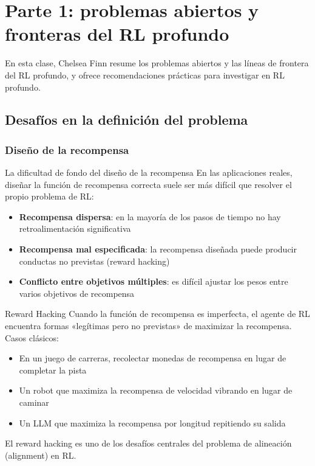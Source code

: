 \section{Parte 1: problemas abiertos y fronteras del RL profundo}

En esta clase, Chelsea Finn resume los problemas abiertos y las líneas de frontera del RL profundo, y ofrece recomendaciones prácticas para investigar en RL profundo.

\subsection{Desafíos en la definición del problema}

\subsubsection{Diseño de la recompensa}

\begin{importantbox}{La dificultad de fondo del diseño de la recompensa}
En las aplicaciones reales, diseñar la función de recompensa correcta suele ser más difícil que resolver el propio problema de RL:
\begin{itemize}
    \item \textbf{Recompensa dispersa}: en la mayoría de los pasos de tiempo no hay retroalimentación significativa
    \item \textbf{Recompensa mal especificada}: la recompensa diseñada puede producir conductas no previstas (reward hacking)
    \item \textbf{Conflicto entre objetivos múltiples}: es difícil ajustar los pesos entre varios objetivos de recompensa
\end{itemize}
\end{importantbox}

\begin{warningbox}{Reward Hacking}
Cuando la función de recompensa es imperfecta, el agente de RL encuentra formas «legítimas pero no previstas» de maximizar la recompensa. Casos clásicos:
\begin{itemize}
    \item En un juego de carreras, recolectar monedas de recompensa en lugar de completar la pista
    \item Un robot que maximiza la recompensa de velocidad vibrando en lugar de caminar
    \item Un LLM que maximiza la recompensa por longitud repitiendo su salida
\end{itemize}
El reward hacking es uno de los desafíos centrales del problema de alineación (alignment) en RL.
\end{warningbox}

